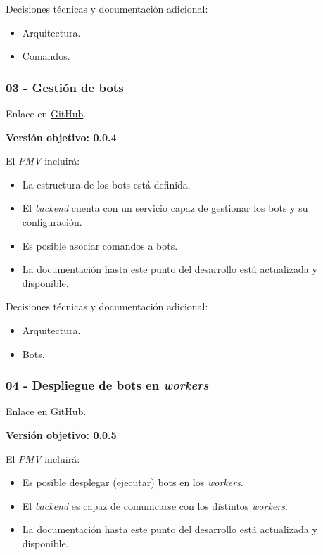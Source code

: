 Decisiones técnicas y documentación adicional:

\begin{itemize}
	\item Arquitectura.
	\item Comandos.
\end{itemize}

\subsubsection{03 - Gestión de bots}

Enlace en \href{https://github.com/harvestcore/matroos/milestone/6}{GitHub}.

\textbf{Versión objetivo: 0.0.4}


El \textit{PMV} incluirá:

\begin{itemize}
	\item La estructura de los bots está definida.
	\item El \textit{backend} cuenta con un servicio capaz de gestionar los bots y su configuración.
	\item Es posible asociar comandos a bots.
	\item La documentación hasta este punto del desarrollo está actualizada y disponible.
\end{itemize}

Decisiones técnicas y documentación adicional:

\begin{itemize}
	\item Arquitectura.
	\item Bots.
\end{itemize}

\subsubsection{04 - Despliegue de bots en \textit{workers}}

Enlace en \href{https://github.com/harvestcore/matroos/milestone/5}{GitHub}.

\textbf{Versión objetivo: 0.0.5}


El \textit{PMV} incluirá:

\begin{itemize}
	\item Es posible desplegar (ejecutar) bots en los \textit{workers}.
	\item El \textit{backend} es capaz de comunicarse con los distintos \textit{workers}.
	\item La documentación hasta este punto del desarrollo está actualizada y disponible.
\end{itemize}

